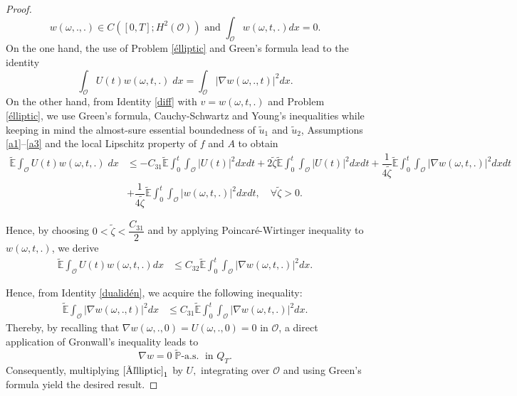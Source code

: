 \documentclass[10pt,number,preprint,times]{elsarticle}
\numberwithin{equation}{section} %
\begin{document}
\begin{proof}
$$
w(\omega,.,.) \in C([0,T];H^2(\mathcal{O})) \text{ and } \int_{\mathcal{O}} w(\omega,t,.) dx=0.$$
On the one hand, the use of Problem \eqref{élliptic} and Green's formula lead to the identity
\begin{equation}\label{dualidén}
\int_\mathcal{O} U(t)w(\omega,t,.)\; dx=\int_{\mathcal{O}} \vert \nabla w(\omega,.,t) \vert^2 dx.
\end{equation}
On the other hand, from Identity \eqref{diff} with $v=w(\omega,t,.)$ and Problem \eqref{élliptic}, we use Green's formula, Cauchy-Schwartz and Young's inequalities while keeping in mind the almost-sure essential boundedness of $\tilde{u}_1$ and $\tilde{u}_2$, Assumptions \ref{a1}--\ref{a3} and the local Lipschitz property of $f$ and $A$ to obtain 
\begin{align*}
		\tilde{\mathbb{E}} \int_\mathcal{O} U(t)w(\omega,t,.)\; dx &\leq -C_{31} \tilde{\mathbb{E}} \int_0^t \int_{\mathcal{O}} \vert U(t)\vert^2 dx dt+2\tilde{\zeta} \tilde{\mathbb{E}} \int_0^t \int_\mathcal{O}  \vert U(t)\vert^2 dx dt+\dfrac{1}{4 \tilde{\zeta}} \tilde{\mathbb{E}} \int_0^t \int_\mathcal{O} \vert \nabla w(\omega,t,.) \vert^2 dxdt\\
		&+\dfrac{1}{4 \tilde{\zeta}} \tilde{\mathbb{E}}\int_0^t \int_{\mathcal{O}} \vert w(\omega,t,.) \vert^2 dxdt, \quad \forall \tilde{\zeta}>0.
\end{align*}

\noindent
Hence, by choosing $0<\tilde{\zeta}<\dfrac{C_{31}}{2}$ and by applying Poincaré-Wirtinger inequality to $w(\omega,t,.)$, we derive
\begin{align*}
\tilde{\mathbb{E}}	\int_{\mathcal{O}} U(t) w(\omega,t,.) dx 
&\leq C_{32} \tilde{\mathbb{E}} \int_0^t \int_{\mathcal{O}} \vert \nabla w(\omega,t,.) \vert^2 dx.
\end{align*}


\noindent
Hence, from Identity \eqref{dualidén}, we acquire the following inequality:
\begin{align*}
	\tilde{\mathbb{E}}	\int_{\mathcal{O}} \vert \nabla w(\omega,.,t) \vert^2 dx 
	&\leq C_{31} \tilde{\mathbb{E}} \int_0^t \int_{\mathcal{O}} \vert \nabla w(\omega,t,.) \vert^2 dx.
\end{align*}
Thereby, by recalling that $\nabla w (\omega,.,0)=U(\omega,.,0)=0 \text{ in } \mathcal{O}$, a direct application of Gronwall's inequality leads to
	$$
\nabla w=0 \; \tilde{\mathbb{P}}\text{-a.s.} \; \text{ in } Q_T.
$$
Consequently, multiplying  $\eqref{élliptic}_1$ by $U,$ integrating over $\mathcal{O}$ and using Green's formula yield the desired result.
\end{proof}
\end{document}
